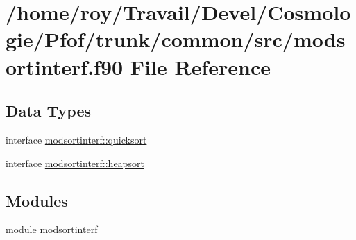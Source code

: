 \hypertarget{modsortinterf_8f90}{}\section{/home/roy/\+Travail/\+Devel/\+Cosmologie/\+Pfof/trunk/common/src/modsortinterf.f90 File Reference}
\label{modsortinterf_8f90}
\subsection*{Data Types}
\begin{DoxyCompactItemize}
\item 
interface \hyperlink{interfacemodsortinterf_1_1quicksort}{modsortinterf\+::quicksort}
\item 
interface \hyperlink{interfacemodsortinterf_1_1heapsort}{modsortinterf\+::heapsort}
\end{DoxyCompactItemize}
\subsection*{Modules}
\begin{DoxyCompactItemize}
\item 
module \hyperlink{namespacemodsortinterf}{modsortinterf}
\end{DoxyCompactItemize}
